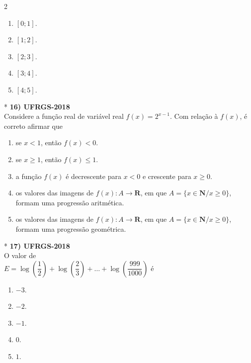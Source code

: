 \documentclass[11pt,a4paper]{article}
\begin{document}
\begin{paracol}{2}
\begin{enumerate}[label=(\Alph*)]
    \item $[0; 1]$.
    \item $[1; 2]$.
    \item $[2; 3]$.
    \item $[3; 4]$.
    \item $[4; 5]$.
\end{enumerate}
\vspace{0.4cm}

\switchcolumn[1]
\vspace{6cm}

\switchcolumn[0]*
\textbf{16) UFRGS-2018} \\
Considere a função real de variável real $f(x) = 2^{x-1}$. Com relação à $f(x)$, é correto afirmar que

\begin{enumerate}[label=(\Alph*), itemsep=0.2cm]
    \item se $x < 1$, então $f(x) < 0$.
    \item se $x \ge 1$, então $f(x) \le 1$.
    \item a função $f(x)$ é decrescente para $x < 0$ e crescente para $x \ge 0$.
    \item os valores das imagens de $f(x): A \rightarrow \mathbf{R}$, em que $A = \{x \in \mathbf{N} / x \ge 0\}$, formam uma progressão aritmética.
    \item os valores das imagens de $f(x): A \rightarrow \mathbf{R}$, em que $A = \{x \in \mathbf{N} / x \ge 0\}$, formam uma progressão geométrica.
\end{enumerate}
\vspace{0.4cm}

\switchcolumn[1]
\vspace{8.5cm}

\switchcolumn[0]*
\textbf{17) UFRGS-2018} \\
O valor de \\
$E = \log\left(\dfrac{1}{2}\right) + \log\left(\dfrac{2}{3}\right) + \dots + \log\left(\dfrac{999}{1000}\right)$ é

\begin{enumerate}[label=(\Alph*)]
    \item $-3$.
    \item $-2$.
    \item $-1$.
    \item $0$.
    \item $1$.
\end{enumerate}
\vspace{0.4cm}


\end{paracol}
\end{document}
